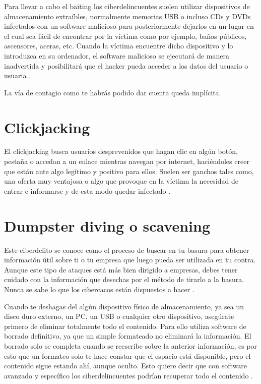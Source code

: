 \documentclass[
  a4paper,
  openany]{book}
\begin{document}
Para llevar a cabo el baiting los ciberdelincuentes suelen utilizar dispositivos de almacenamiento extraíbles, normalmente memorias USB o incluso CDs y DVDs infectados con un software malicioso para posteriormente dejarlos en un lugar en el cual sea fácil de encontrar por la víctima como por ejemplo, baños públicos, ascensores, aceras, etc. Cuando la víctima encuentre dicho dispositivo y lo introduzca en su ordenador, el software malicioso se ejecutará de manera inadvertida y posibilitará que el hacker pueda acceder a los datos del usuario o usuaria \citep{baiting}.

La vía de contagio como te habrás podido dar cuenta queda implícita.

\hypertarget{clickjacking}{%
\section{Clickjacking}\label{clickjacking}}

El clickjacking busca usuarios desprevenidos que hagan clic en algún botón, pestaña o accedan a un enlace mientras navegan por internet, haciéndoles creer que están ante algo legítimo y positivo para ellos. Suelen ser ganchos tales como, una oferta muy ventajosa o algo que provoque en la víctima la necesidad de entrar e informarse y de esta modo quedar infectado \citep{WIKI-clickjacking}.

\hypertarget{dumpster-diving-o-scavening}{%
\section{Dumpster diving o scavening}\label{dumpster-diving-o-scavening}}

Este ciberdelito se conoce como el proceso de buscar en tu basura para obtener información útil sobre ti o tu empresa que luego pueda ser utilizada en tu contra. Aunque este tipo de ataques está más bien dirigido a empresas, debes tener cuidado con la información que desechas por el método de tirarlo a la basura. Nunca se sabe lo que los cibercacos están dispuestos a hacer \citep{WIKI-dumpster-diving}.

Cuando te deshagas del algún dispositivo físico de almacenamiento, ya sea un disco duro externo, un PC, un USB o cualquier otro dispositivo, asegúrate primero de eliminar totalmente todo el contenido. Para ello utiliza software de borrado definitivo, ya que un simple formateado no eliminará la información. El borrado solo se completa cuando se reescribe sobre la anterior información, es por esto que un formateo solo te hace constar que el espacio está disponible, pero el contenido sigue estando ahí, aunque oculto. Esto quiere decir que con software avanzado y específico los ciberdelincuentes podrían recuperar todo el contenido \citep{XATAKA-borrado-almacenamiento}.
\end{document}

